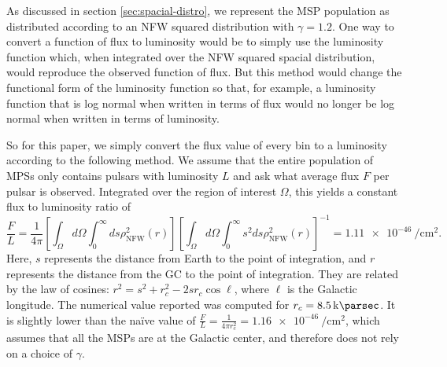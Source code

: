 \documentclass[a4paper,11pt]{article}
\newcommand{\brackets}[1]{\left[#1\right]}
\newcommand{\comment}[1]{\emph{\color{red}{#1}}}
\begin{document}
As discussed in section \ref{sec:spacial-distro}, we represent the MSP population as distributed according to an NFW squared distribution with $\gamma = 1.2$. One way to convert a function of flux to luminosity would be to simply use the luminosity function which, when integrated over the NFW squared spacial distribution, would reproduce the observed function of flux. But this method would change the functional form of the luminosity function so that, for example, a luminosity function that is log normal when written in terms of flux would no longer be log normal when written in terms of luminosity. \comment{Is it worth devoting a whole paragraph to describing something I do not intend to do? I do it to avoid confusion.}

So for this paper, we simply convert the flux value of every bin to a luminosity according to the following method. We assume that the entire population of MPSs only contains pulsars with luminosity $L$ and ask what average flux $F$ per pulsar is observed. Integrated over the region of interest $\Omega$, this yields a constant flux to luminosity ratio of
\begin{equation}
    \frac{F}{L} = \frac{1}{4\pi}\brackets{\int_{\Omega}d\Omega\int_0^\infty ds \rho_\text{NFW}^2 (r)}\brackets{\int_{\Omega}d\Omega \int_0^\infty s^2 ds \rho_\text{NFW}^2 (r)}^{-1} = \SI{1.11e-46}{\per\centi\meter\squared}.
    \label{eqn:f-to-l}
\end{equation}
Here, $s$ represents the distance from Earth to the point of integration, and $r$ represents the distance from the GC to the point of integration. They are related by the law of cosines: $r^2 = s^2 + r_c^2 - 2s r_c \cos \ell$, where $\ell$ is the Galactic longitude. The numerical value reported was computed for $r_c = \SI{8.5}{\kilo\parsec}$. It is slightly lower than the na\"ive value of $\frac{F}{L} = \frac{1}{4\pi r_c^2} = \SI{1.16e-46}{\per\centi\meter\squared}$, which assumes that all the MSPs are at the Galactic center, and therefore does not rely on a choice of $\gamma$.
\end{document}
